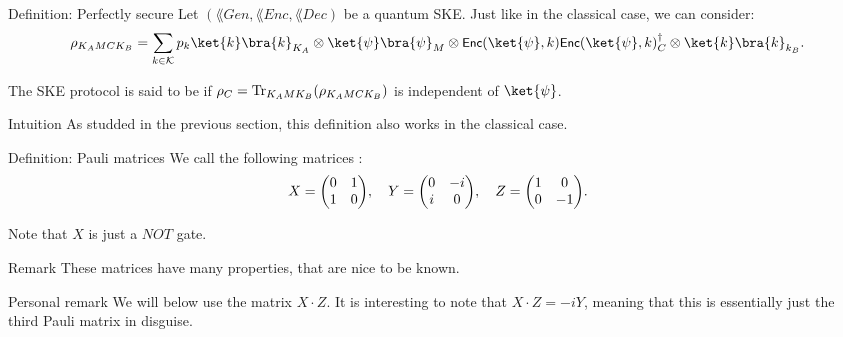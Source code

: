 \documentclass[a4paper]{article}
\begin{document}
\begin{parag}{Definition: Perfectly secure}
    Let $\left(\lang{Gen}, \lang{Enc}, \lang{Dec}\right)$ be a quantum SKE. Just like in the classical case, we can consider: 
    \[\rho_{K_A M C K_B} = \sum_{k \in \mathcal{K}} p_k \ket{k}\bra{k}_{K_A} \otimes \ket{\psi}\bra{\psi}_M \otimes \lang{Enc}\left(\ket{\psi}, k\right)\lang{Enc}\left(\ket{\psi}, k\right)^{\dagger}_{C} \otimes \ket{k}\bra{k}_{k_B}.\]
    

    The SKE protocol is said to be  if $\rho_C = \Tr_{K_A M K_B}\left(\rho_{K_A M C K_B}\right)$ is independent of $\ket{\psi}$. 

    \begin{subparag}{Intuition}
        As studded in the previous section, this definition also works in the classical case.
    \end{subparag}
\end{parag}

\begin{parag}{Definition: Pauli matrices}
    We call the following matrices : 
    \[X = \begin{pmatrix} 0 & 1 \\ 1 & 0 \end{pmatrix}, \mathspace Y = \begin{pmatrix} 0 & -i \\ i & 0 \end{pmatrix}, \mathspace Z = \begin{pmatrix} 1 & 0 \\ 0 & -1 \end{pmatrix}.\]

    Note that $X$ is just a $NOT$ gate.

    \begin{subparag}{Remark}
        These matrices have many properties, that are nice to be known.
    \end{subparag}

    \begin{subparag}{Personal remark}
        We will below use the matrix $X\cdot Z$. It is interesting to note that $X\cdot Z = -i Y$, meaning that this is essentially just the third Pauli matrix in disguise.
    \end{subparag}
\end{parag}
\end{document}
